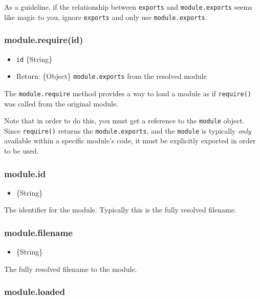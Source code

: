 As a guideline, if the relationship between \texttt{exports} and
\texttt{module.exports} seems like magic to you, ignore \texttt{exports}
and only use \texttt{module.exports}.

\subsubsection{module.require(id)}\label{module.requireid}

\begin{itemize}
\itemsep1pt\parskip0pt
\item
  \texttt{id} \{String\}
\item
  Return: \{Object\} \texttt{module.exports} from the resolved module
\end{itemize}

The \texttt{module.require} method provides a way to load a module as if
\texttt{require()} was called from the original module.

Note that in order to do this, you must get a reference to the
\texttt{module} object. Since \texttt{require()} returns the
\texttt{module.exports}, and the \texttt{module} is typically
\emph{only} available within a specific module's code, it must be
explicitly exported in order to be used.

\subsubsection{module.id}\label{module.id}

\begin{itemize}
\itemsep1pt\parskip0pt
\item
  \{String\}
\end{itemize}

The identifier for the module. Typically this is the fully resolved
filename.

\subsubsection{module.filename}\label{module.filename}

\begin{itemize}
\itemsep1pt\parskip0pt
\item
  \{String\}
\end{itemize}

The fully resolved filename to the module.

\subsubsection{module.loaded}\label{module.loaded}


